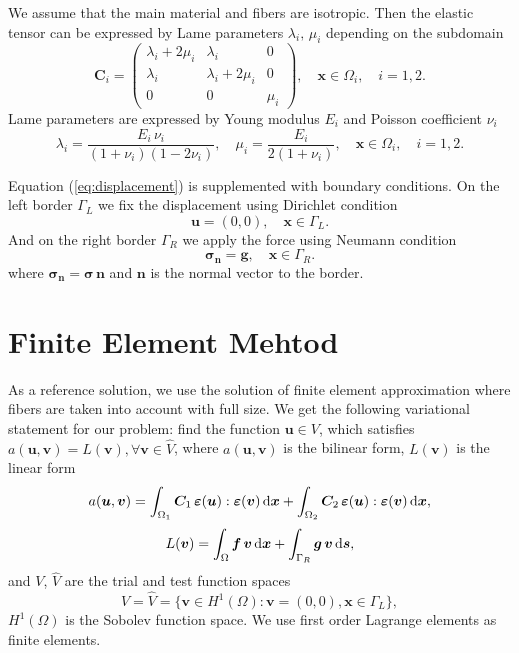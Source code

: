 \documentclass[a4paper]{jpconf}
\begin{document}
We assume that the main material and fibers are isotropic. Then the elastic tensor can be expressed by Lame parameters $\lambda_i,\, \mu_i$ depending on the subdomain
\[
\bm{C}_i = \left( \begin{matrix}
\lambda_i+2\mu_i & \lambda_i & 0  \\
\lambda_i & \lambda_i+2\mu_i & 0  \\
0 & 0 & \mu_i 
\end{matrix}  \right), \quad \bm{x} \in \Omega_i, \quad i=1,2.
\]
Lame parameters are expressed by Young modulus $E_i$ and Poisson coefficient $\nu_i$
\[
\lambda_i = \frac{E_i\, \nu_i}{(1 + \nu_i) (1 - 2 \nu_i)}, \quad
\mu_i = \frac{E_i}{2 (1 + \nu_i)}, \quad \bm{x} \in \Omega_i, \quad i=1,2.
\]

Equation (\ref{eq:displacement}) is supplemented with boundary conditions. On the left border $\Gamma_L$ we fix the displacement using Dirichlet condition
\[
\bm{u} = (0, 0), \quad \bm{x} \in \Gamma_L.
\]
And on the right border $\Gamma_R$ we apply the force using Neumann condition
\[
\bm{\sigma}_{\bm{n}} = \bm{g}, \quad \bm{x} \in \Gamma_R.
\]
where $\bm{\sigma}_{\bm{n}}=\bm{\sigma}\,\bm{n}$ and $\bm{n}$ is the normal vector to the border.

\section{Finite Element Mehtod}

As a reference solution, we use the solution of finite element approximation where fibers are taken into account with full size.
We get the following variational statement for our problem: find the function $\bm{u} \in V$, which satisfies  $a(\bm{u},\bm{v}) = L(\bm{v}), \forall \bm{v} \in \widehat{V}$, where $a(\bm{u}, \bm{v})$ is the bilinear form, $L(\bm{v})$ is the linear form
\begin{equation}
a(\bm{u}, \bm{v}) = \int_{\Omega_1} \bm{C}_1 \, \bm{\varepsilon}(\bm{u}): \bm{\varepsilon}(\bm{v})\, {\rm d}\bm{x} + \int_{\Omega_2} \bm{C}_2 \, \bm{\varepsilon}(\bm{u}) : \bm{\varepsilon}(\bm{v}) \,{\rm d}\bm{x},
\label{eq:bilinear-fem}
\end{equation}
\begin{equation}
L(\bm{v}) = \int_{\Omega}\bm{f}\, \bm{v}\, {\rm d}\bm{x} + \int_{\Gamma_R}\bm{g}\, \bm{v}\, {\rm d}\bm{s},
\label{eq:linear-fem}
\end{equation}
and $V$, $\widehat{V}$ are the trial and test function spaces
\[
V = \widehat{V} = \{\bm{v} \in H^1(\Omega) : \bm{v} = (0, 0), \bm{x} \in \Gamma_L \},
\]
$H^1(\Omega)$ is the Sobolev function space. We use first order Lagrange elements as finite elements.
\end{document}
